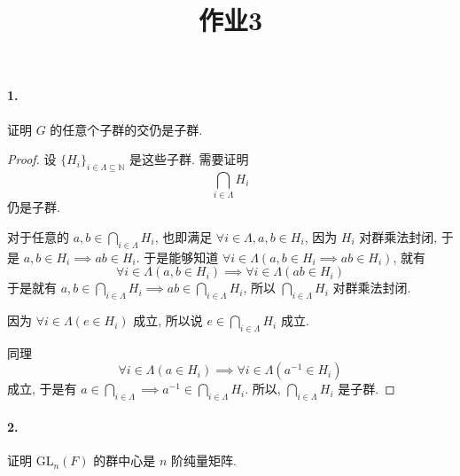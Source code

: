 \documentclass[12pt]{ctexart}
\theoremstyle{definition}
\theoremstyle{plain}
\theoremstyle{remark}
\begin{document}
\title{作业3}

\paragraph{1. } 证明 \(G\) 的任意个子群的交仍是子群. 
\begin{proof}
	设 \(\{ H _{i} \}_{i\in \Lambda \subseteq \mathbb{N}}\) 是这些子群. 需要证明
	\[
	\bigcap _{i \in \Lambda} H_{i} 
	\]
	仍是子群. 

	对于任意的 \(a , b \in \bigcap _{i \in \Lambda } H _{i}\), 也即满足 \(\forall i \in \Lambda , a ,b \in H_{i}\), 因为 \(H_{i}\) 对群乘法封闭, 于是 \(a , b \in H _{i} \implies a b \in H_{i}\). 
	于是能够知道 \(\forall i \in \Lambda (a, b \in H_{i} \implies ab \in H_{i})\), 就有 
	\[
	\forall i \in \Lambda ( a , b \in H _{i} ) \implies \forall i \in \Lambda (ab \in H_{i})
	\]
	于是就有 \(a , b \in \bigcap _{i \in \Lambda} H_{i} \implies ab \in \bigcap _{i \in \Lambda } H_{i}\), 所以 \(\bigcap _{i \in \Lambda } H_{i}\) 对群乘法封闭. 

	因为 \(\forall i \in \Lambda ( e \in H_{i})\) 成立, 所以说 \(e \in \bigcap_{i\in\Lambda}H_{i}\) 成立. 

	同理
	\[
		\forall i \in \Lambda ( a \in H_{i} ) \implies \forall i \in \Lambda (a ^{-1} \in H_{i})
	\]
	成立, 于是有 \(a \in \bigcap _{i \in \Lambda} \implies a ^{-1} \in \bigcap _{i \in \Lambda} H_{i}\). 所以, \(\bigcap _{i \in \Lambda} H_{i}\) 是子群. 
\end{proof}

\paragraph{2.} 证明 \(\text{GL}_{n}(F)\) 的群中心是 \(n\) 阶纯量矩阵.
\end{document}
